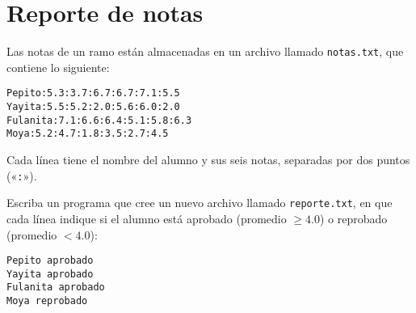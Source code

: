 \section{Reporte de notas}

Las notas de un ramo están almacenadas en un archivo llamado
\lstinline!notas.txt!, que contiene lo siguiente:
\begin{lstlisting}[language=file]
Pepito:5.3:3.7:6.7:6.7:7.1:5.5
Yayita:5.5:5.2:2.0:5.6:6.0:2.0
Fulanita:7.1:6.6:6.4:5.1:5.8:6.3
Moya:5.2:4.7:1.8:3.5:2.7:4.5
\end{lstlisting}

Cada línea tiene el nombre del alumno y sus seis notas, separadas por
dos puntos («\lstinline!:!»).

Escriba un programa que cree un nuevo archivo llamado
\lstinline!reporte.txt!, en que cada línea indique si el alumno está
aprobado (promedio \(\ge 4.0\)) o reprobado (promedio \(< 4.0\)):
\begin{lstlisting}
Pepito aprobado
Yayita aprobado
Fulanita aprobado
Moya reprobado
\end{lstlisting}

